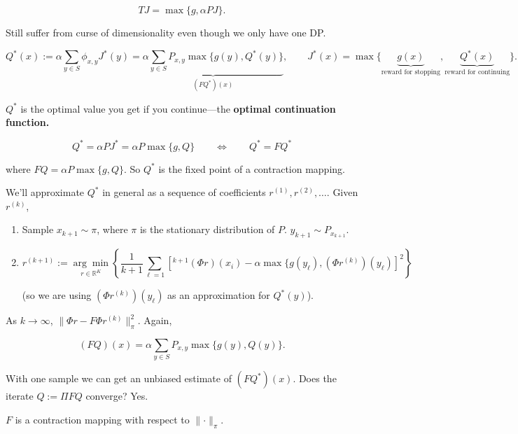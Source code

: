 \[
TJ = \max\{g, \alpha PJ \}.
\]

Still suffer from curse of dimensionality even though we only have one DP.

\[
Q^*(x) := \alpha \sum_{y \in S} \phi_{x, y} J^*(y) = \underbrace{\alpha \sum_{y \in S} P_{x,y} \max\{g(y), Q^*(y)\}}_{(FQ^*)(x)}, \qquad J^*(x) = \max\{ \underbrace{g(x)}_{\text{reward for stopping}} , \underbrace{Q^*(x)}_{\text{reward for continuing}}\}.
\]

\(Q^*\) is the optimal value you get if you continue---the \textbf{optimal continuation function.} 

\[
Q^* = \alpha P J^* = \alpha P \max\{g, Q\} \qquad \iff \qquad Q^* = F Q^*
\]

where \(FQ = \alpha P \max\{g, Q\}\). So \(Q^*\) is the fixed point of a contraction mapping.

We'll approximate \(Q^*\) in general as a sequence of coefficients \(r^{(1)}, r^{(2)}, \ldots\). Given \(r^{(k)}\), 

\begin{enumerate}

\item Sample \(x_{k+1} \sim \pi\), where \(\pi\) is the stationary distribution of \(P\). \(y_{k+1} \sim P_{x_{k+1}}\). 

\item 

\[
r^{(k+1)} := \underset{r \in \mathbb{R}^K}{\arg \min} \left\{  \frac{1}{k+1} \sum_{\ell=1} \left[^{k+1} (\Phi r)(x_i) - \alpha \max \{g(y_\ell), (\Phi r^{(k)} )(y_\ell) \right]^2 \right\}
\]

(so we are using \( (\Phi r^{(k)} )(y_\ell)\) as an approximation for \(Q^*(y)\)).

\end{enumerate}

As \(k \to \infty\), \(\lVert \Phi r - F \Phi r^{(k)} \rVert_\pi^2\). Again,

\[
(FQ)(x) = \alpha \sum_{y \in S} P_{x,y} \max\{g(y), Q(y) \}.
\]

With one sample we can get an unbiased estimate of \((FQ^*)(x)\). Does the iterate \(Q := \Pi F Q\) converge? Yes.

\begin{lemma}

\(F\) is a contraction mapping with respect to \(\lVert \cdot \rVert_\pi\).

\end{lemma}



